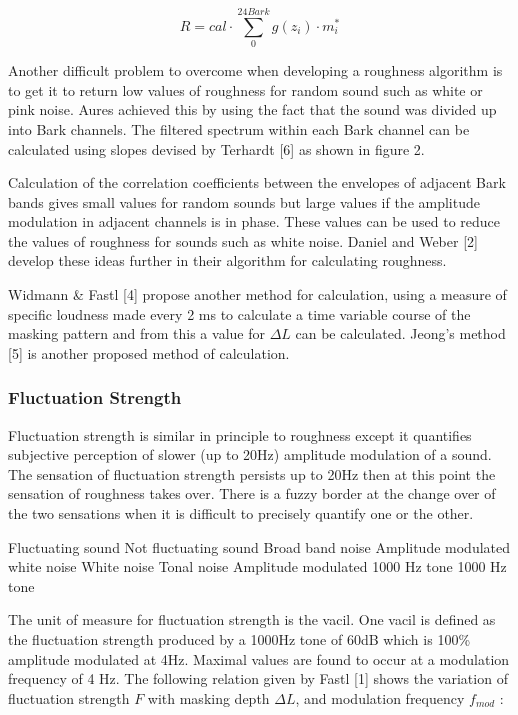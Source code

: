 \[ R = cal \cdot \sum_0^{24Bark} g(z_i) \cdot m^*_i \]

Another difficult problem to overcome when developing a roughness
algorithm is to get it to return low values of roughness for random
sound such as white or pink noise. Aures achieved this by using the fact
that the sound was divided up into Bark channels. The filtered spectrum
within each Bark channel can be calculated using slopes devised by
Terhardt {[}6{]} as shown in figure 2.

\bigskip

Calculation of the correlation coefficients between the envelopes of
adjacent Bark bands gives small values for random sounds but large
values if the amplitude modulation in adjacent channels is in phase.
These values can be used to reduce the values of roughness for sounds
such as white noise. Daniel and Weber {[}2{]} develop these ideas
further in their algorithm for calculating roughness.

\bigskip

Widmann \& Fastl {[}4{]} propose another method for calculation, using a
measure of specific loudness made every 2 ms to calculate a time
variable course of the masking pattern and from this a value for $\Delta
L$ can be calculated. Jeong's method {[}5{]} is another proposed method
of calculation.

\subsubsection*{Fluctuation Strength}\label{fluctuation-strength}

Fluctuation strength is similar in principle to roughness except it
quantifies subjective perception of slower (up to 20Hz) amplitude
modulation of a sound. The sensation of fluctuation strength persists up
to 20Hz then at this point the sensation of roughness takes over. There
is a fuzzy border at the change over of the two sensations when it is
difficult to precisely quantify one or the other. 

\bigskip

Fluctuating sound Not fluctuating sound Broad band noise Amplitude
modulated white noise White noise Tonal noise Amplitude modulated 1000
Hz tone 1000 Hz tone

\bigskip

The unit of measure for fluctuation strength is the vacil. One vacil is
defined as the fluctuation strength produced by a 1000Hz tone of 60dB
which is 100\% amplitude modulated at 4Hz. Maximal values are found to
occur at a modulation frequency of 4 Hz. The following relation given by
Fastl {[}1{]} shows the variation of fluctuation strength $F$ with
masking depth $\Delta L$, and modulation frequency $f_{mod}$ :

